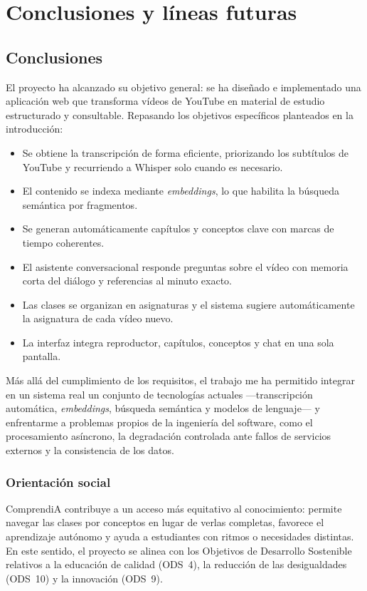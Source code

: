\chapter{Conclusiones y líneas futuras}
\label{cap:conclusiones}

\section{Conclusiones}

El proyecto ha alcanzado su objetivo general: se ha diseñado e implementado una aplicación web
que transforma vídeos de YouTube en material de estudio estructurado y consultable. Repasando los
objetivos específicos planteados en la introducción:

\begin{itemize}
  \item Se obtiene la transcripción de forma eficiente, priorizando los subtítulos de YouTube y
        recurriendo a Whisper solo cuando es necesario.
  \item El contenido se indexa mediante \textit{embeddings}, lo que habilita la búsqueda semántica
        por fragmentos.
  \item Se generan automáticamente capítulos y conceptos clave con marcas de tiempo coherentes.
  \item El asistente conversacional responde preguntas sobre el vídeo con memoria corta del
        diálogo y referencias al minuto exacto.
  \item Las clases se organizan en asignaturas y el sistema sugiere automáticamente la asignatura
        de cada vídeo nuevo.
  \item La interfaz integra reproductor, capítulos, conceptos y chat en una sola pantalla.
\end{itemize}

Más allá del cumplimiento de los requisitos, el trabajo me ha permitido integrar en un sistema
real un conjunto de tecnologías actuales —transcripción automática, \textit{embeddings},
búsqueda semántica y modelos de lenguaje— y enfrentarme a problemas propios de la ingeniería del
software, como el procesamiento asíncrono, la degradación controlada ante fallos de servicios
externos y la consistencia de los datos.

\subsection{Orientación social}

ComprendiA contribuye a un acceso más equitativo al conocimiento: permite navegar las clases por
conceptos en lugar de verlas completas, favorece el aprendizaje autónomo y ayuda a estudiantes
con ritmos o necesidades distintas. En este sentido, el proyecto se alinea con los Objetivos de
Desarrollo Sostenible relativos a la educación de calidad (ODS~4), la reducción de las
desigualdades (ODS~10) y la innovación (ODS~9).

